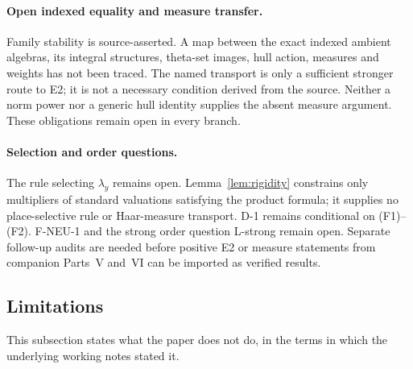 \documentclass[11pt,a4paper]{article}
\theoremstyle{definition}
\theoremstyle{plain}
\theoremstyle{definition}
\begin{document}
\paragraph{Open indexed equality and measure transfer.}
Family stability is source-asserted. A map between the exact indexed
ambient algebras, its integral structures, theta-set images, hull action,
measures and weights has not been traced. The named transport is only
a sufficient stronger route to E2; it is not a necessary condition derived
from the source. Neither a norm power nor a generic hull identity supplies
the absent measure argument. These obligations remain open in every branch.

\paragraph{Selection and order questions.}
The rule selecting $\lambda_y$ remains open. Lemma~\ref{lem:rigidity}
constrains only multipliers of standard valuations satisfying the product
formula; it supplies no place-selective rule or Haar-measure transport.
D-1 remains conditional on (F1)--(F2). F-NEU-1 and the strong order
question L-strong remain open. Separate follow-up audits are needed before
positive E2 or measure statements from companion Parts~V and~VI can be
imported as verified results.

\subsection{Limitations}
\label{sec:limitations}

This subsection states what the paper does not do, in the terms in which the
underlying working notes stated it.
\end{document}
